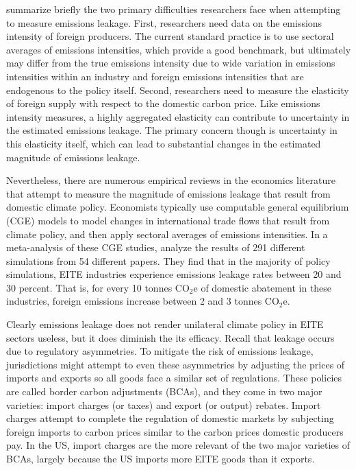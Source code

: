 \cite{fowlie2018challenges} summarize briefly the two primary difficulties researchers face when attempting to measure emissions leakage. First, researchers need data on the emissions intensity of foreign producers. The current standard practice is to use sectoral averages of emissions intensities, which provide a good benchmark, but ultimately may differ from the true emissions intensity due to wide variation in emissions intensities within an industry and foreign emissions intensities that are endogenous to the policy itself. Second, researchers need to measure the elasticity of foreign supply with respect to the domestic carbon price. Like emissions intensity measures, a highly aggregated elasticity can contribute to uncertainty in the estimated emissions leakage. The primary concern though is uncertainty in this elasticity itself, which can lead to substantial changes in the estimated magnitude of emissions leakage. 

Nevertheless, there are numerous empirical reviews in the economics literature that attempt to measure the magnitude of emissions leakage that result from domestic climate policy. Economists typically use computable general equilibrium (CGE) models to model changes in international trade flows that result from climate policy, and then apply sectoral averages of emissions intensities. In a meta-analysis of these CGE studies, \cite{carbone2017impacts} analyze the results of 291 different simulations from 54 different papers. They find that in the majority of policy simulations, EITE industries experience emissions leakage rates between 20 and 30 percent. That is, for every 10 tonnes CO$_2$e of domestic abatement in these industries, foreign emissions increase between 2 and 3 tonnes CO$_2$e. 

Clearly emissions leakage does not render unilateral climate policy in EITE sectors useless, but it does diminish the its efficacy. Recall that leakage occurs due to regulatory asymmetries. To mitigate the risk of emissions leakage, jurisdictions might attempt to even these asymmetries by adjusting the prices of imports and exports so all goods face a similar set of regulations. These policies are called border carbon adjustments (BCAs), and they come in two major varieties: import charges (or taxes) and export (or output) rebates. Import charges attempt to complete the regulation of domestic markets by subjecting foreign imports to carbon prices similar to the carbon prices domestic producers pay. In the US, import charges are the more relevant of the two major varieties of BCAs, largely because the US imports more EITE goods than it exports. 

